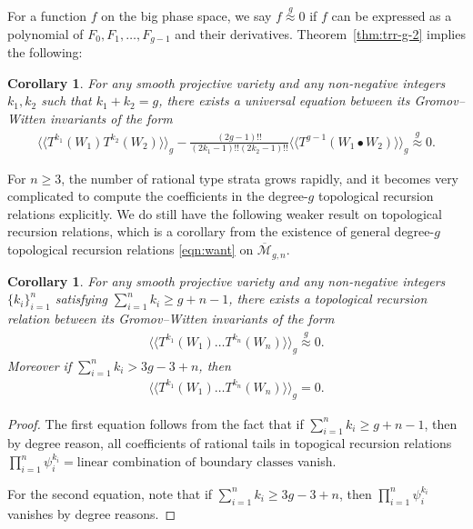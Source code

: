 \documentclass[12pt,reqno]{amsart}
\theoremstyle{plain}
\newtheorem{proposition}[theorem]{Proposition}
\newtheorem{corollary}[theorem]{Corollary}
\theoremstyle{definition}
\theoremstyle{remark}
\newcommand{\Xin}[1]{{\color{magenta}{\texttt Xin: #1}}}
\begin{document}
For a function $f$  on the big phase space, we say $f\overset{g}{\approx}0$ if $f$ can be
expressed as a polynomial of $F_0,F_1,\dots,F_{g-1}$ and their derivatives.
Theorem~\ref{thm:trr-g-2} implies the following:
\begin{corollary}\label{cor:two-pt-correlation-fun}
For any smooth projective variety and  any non-negative integers $k_1, k_2$ such that $k_1+k_2=g$, 
 there exists a universal equation between its Gromov--Witten invariants of the form
\begin{align*}
\langle\langle T^{k_1}(W_1)T^{k_2}(W_2)\rangle\rangle_g  -\frac{(2g-1)!!}{(2k_1-1)!! (2k_2-1)!!}\langle\langle T^{g-1}(W_1\bullet W_2)\rangle\rangle_g\overset{g}{\approx}0.  
\end{align*}
\end{corollary}
For $n\geq3$, the number of rational type strata grows rapidly, and it becomes very complicated to compute the coefficients in the degree-$g$ topological recursion relations explicitly.
We do still have the following weaker result on topological recursion relations, which is a corollary from the existence of general degree-$g$ topological recursion relations \eqref{eqn:want} on $\overline{\mathcal{M}}_{g,n}$.
\begin{corollary}
For any smooth projective variety and  any non-negative integers $\{k_i\}_{i=1}^{n}$ satisfying $\sum_{i=1}^{n}k_i\geq g+n-1$, there exists a topological recursion relation between its Gromov--Witten invariants of the form
\begin{align*}
\langle\langle T^{k_1}(W_1)\dots T^{k_n}(W_n)\rangle\rangle_g\overset{g}{\approx}0.    
\end{align*}
Moreover if $\sum_{i=1}^{n}k_i>3g-3+n$, then \begin{align*}
\langle\langle T^{k_1}(W_1)\dots T^{k_n}(W_n)\rangle\rangle_g=0.    
\end{align*}
\end{corollary}
\begin{proof}
  The first equation follows from the fact that if $\sum_{i=1}^{n}k_i\geq g+n-1$, then by degree reason, all coefficients of rational tails in topogical recursion relations $\prod_{i=1}^{n}\psi_i^{k_i}= \text{linear combination of boundary classes}$ vanish.

  For the second equation, note that if $\sum_{i=1}^{n}k_i\geq 3g-3+n$, then $\prod_{i=1}^{n}\psi_i^{k_i}$ vanishes by degree reasons.
\end{proof}

\end{document}
